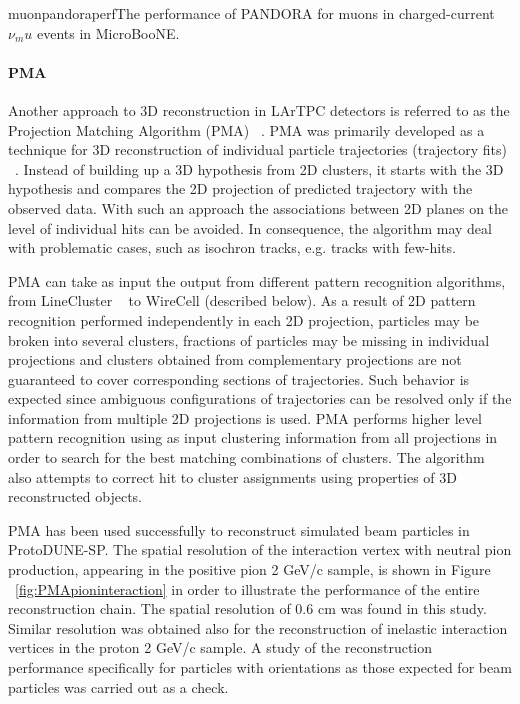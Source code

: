 \begin{cdrfigure}{muonpandoraperf}{The performance of PANDORA for muons in charged-current
  $\nu_mu$ events in MicroBooNE. }
\end{cdrfigure}


\paragraph{PMA}
Another approach to 3D reconstruction in LArTPC detectors is referred to as the Projection Matching Algorithm
(PMA) ~\cite{pma_algorithm}. PMA was primarily developed as a technique for 3D reconstruction
of individual particle trajectories (trajectory fits) ~\cite{icarus3dreco}. Instead of
building up a 3D hypothesis from 2D clusters, it starts with the 3D hypothesis and compares
the 2D projection of predicted trajectory with the observed data. With such an approach
the associations between 2D planes on the level of individual hits can be avoided.
In consequence, the algorithm may deal with problematic cases, such as isochron tracks,
e.g. tracks with few-hits.

PMA can take as input the output from different pattern recognition algorithms, from
LineCluster ~\cite{linecluster} to WireCell (described below). As a result of 2D pattern
recognition performed independently in each 2D projection, particles may be broken
into several clusters, fractions of particles may be missing in individual projections
and clusters obtained from complementary projections are not guaranteed to cover corresponding
sections of trajectories. Such behavior is expected since ambiguous configurations of
trajectories can be resolved only if the information from multiple 2D projections is used.
PMA performs higher level pattern recognition using as input clustering information from all
projections in order to search for the best matching combinations of clusters. The algorithm
also attempts to correct hit to cluster assignments using properties of 3D reconstructed objects.


PMA has been used successfully to reconstruct simulated beam particles in
ProtoDUNE-SP. The spatial resolution of the interaction vertex with neutral pion
production, appearing in the positive pion 2 GeV/c sample, is shown in Figure ~\ref{fig:PMApioninteraction}
in order to illustrate the performance of the entire reconstruction chain. The spatial resolution
of 0.6 cm was found in this study. Similar resolution was obtained also for the reconstruction
of inelastic interaction vertices in the proton 2 GeV/c sample. A study of the reconstruction performance
specifically for particles with orientations as those expected for beam particles was carried out as a check.

